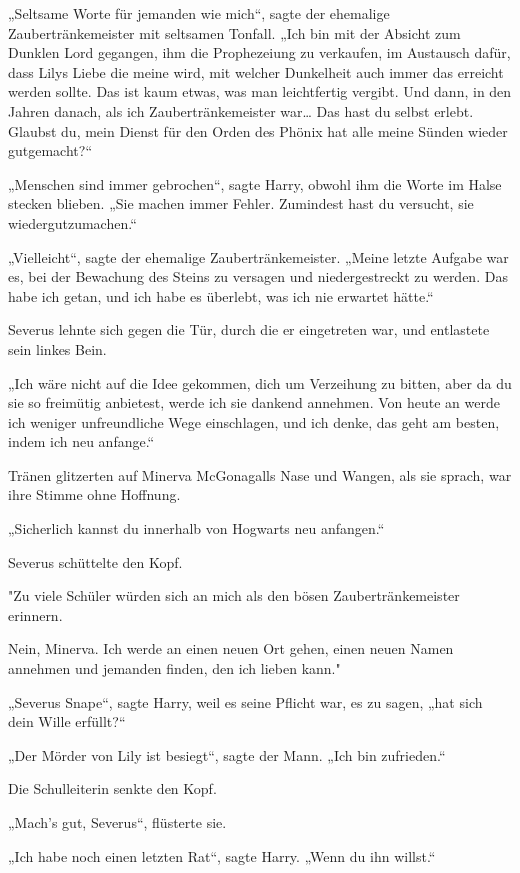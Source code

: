 {„Seltsame Worte für jemanden wie mich“, sagte der ehemalige Zaubertränkemeister mit seltsamen Tonfall. „Ich bin mit der Absicht zum Dunklen Lord gegangen, ihm die Prophezeiung zu verkaufen, im Austausch dafür, dass Lilys Liebe die meine wird, mit welcher Dunkelheit auch immer das erreicht werden sollte. Das ist kaum etwas, was man leichtfertig vergibt. Und dann, in den Jahren danach, als ich Zaubertränkemeister war… Das hast du selbst erlebt. Glaubst du, mein Dienst für den Orden des Phönix hat alle meine Sünden wieder gutgemacht?“

„Menschen sind immer gebrochen“, sagte Harry, obwohl ihm die Worte im Halse stecken blieben. „Sie machen immer Fehler. Zumindest hast du versucht, sie wiedergutzumachen.“

„Vielleicht“, sagte der ehemalige Zaubertränkemeister. „Meine letzte Aufgabe war es, bei der Bewachung des Steins zu versagen und niedergestreckt zu werden. Das habe ich getan, und ich habe es überlebt, was ich nie erwartet hätte.“

Severus lehnte sich gegen die Tür, durch die er eingetreten war, und entlastete sein linkes Bein.

„Ich wäre nicht auf die Idee gekommen, dich um Verzeihung zu bitten, aber da du sie so freimütig anbietest, werde ich sie dankend annehmen. Von heute an werde ich weniger unfreundliche Wege einschlagen, und ich denke, das geht am besten, indem ich neu anfange.“

Tränen glitzerten auf Minerva McGonagalls Nase und Wangen, als sie sprach, war ihre Stimme ohne Hoffnung.

„Sicherlich kannst du innerhalb von Hogwarts neu anfangen.“

Severus schüttelte den Kopf.

"Zu viele Schüler würden sich an mich als den bösen Zaubertränkemeister erinnern.

Nein, Minerva. Ich werde an einen neuen Ort gehen, einen neuen Namen annehmen und jemanden finden, den ich lieben kann."

„Severus Snape“, sagte Harry, weil es seine Pflicht war, es zu sagen, „hat sich dein Wille erfüllt?“

„Der Mörder von Lily ist besiegt“, sagte der Mann. „Ich bin zufrieden.“

Die Schulleiterin senkte den Kopf.

„Mach's gut, Severus“, flüsterte sie.

„Ich habe noch einen letzten Rat“, sagte Harry. „Wenn du ihn willst.“

}
